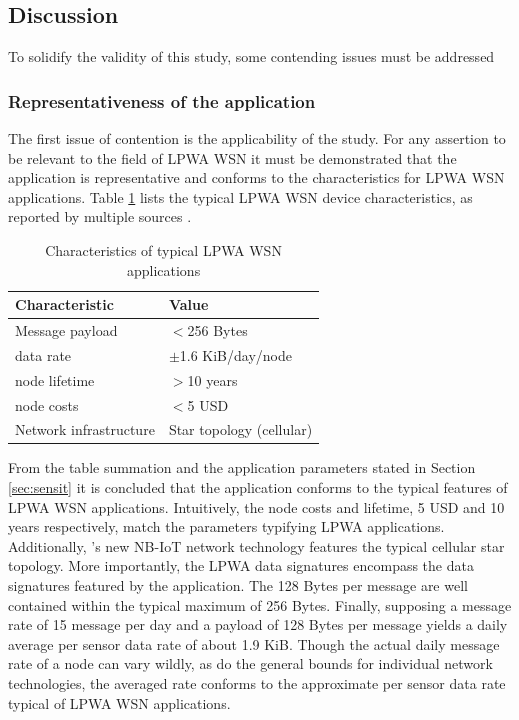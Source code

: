 \subsection{Discussion}
To solidify the validity of this study, some contending issues must be addressed

\subsubsection{Representativeness of the \sensit application}
The first issue of contention is the applicability of the study. For any assertion to be relevant to the field of LPWA WSN it must be demonstrated that the \sensit application is representative and conforms to the characteristics for LPWA WSN applications. Table \ref{table:LPWA-chars} lists the typical LPWA WSN device characteristics, as reported by multiple sources \cite{lora_vs_sigfox_boek, lora_vs_sigfox_whitepaper, nbiot_vs_lora_vs_sigfox, lora_vs_sigfox, tmobile, nbiot}.

\begin{table}
\centering
\begin{tabular}{|l|l|}\hline
Characteristic & Value \\ \hline
Message payload & $<$256 Bytes	\\ \hline
data rate &	$\pm$1.6 KiB/day/node\footnotemark \\ \hline
node lifetime & $>$10 years \\ \hline
node costs & $<$5 USD \\ \hline
Network infrastructure & Star topology (cellular)	\\ \hline
\end{tabular}
\caption{Characteristics of typical LPWA WSN applications}
\label{table:LPWA-chars}
\end{table}


From the table summation and the application parameters stated in Section \ref{sec:sensit} it is concluded that the \sensit application conforms to the typical features of LPWA WSN applications. Intuitively, the node costs and lifetime, 5 USD and 10 years respectively, match the parameters typifying LPWA applications. Additionally, \sensitnospace 's new NB-IoT network technology features the typical cellular star topology. More importantly, the LPWA data signatures encompass the data signatures featured by the \sensit application. The 128 Bytes per message are well contained within the typical maximum of 256 Bytes. Finally, supposing a message rate of 15 message per day and a payload of 128 Bytes per message yields a daily average per sensor data rate of about 1.9 KiB. Though the actual daily message rate of a node can vary wildly, as do the general bounds for individual network technologies, the averaged rate conforms to the approximate per sensor data rate typical of LPWA WSN applications.

